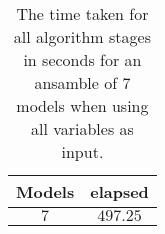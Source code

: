 \begin{table}[!ht]
	\centering
	\begin{tabular}{|c|c|}
		\hline
		Models & elapsed \\ \hline
		$7$ & $497.25$ \\ \hline
	\end{tabular}
	\caption{The time taken for all algorithm stages in seconds for an ansamble of 7 models when using all variables as input.}
	\label{tab:time:ansamble:all:7}
\end{table}
